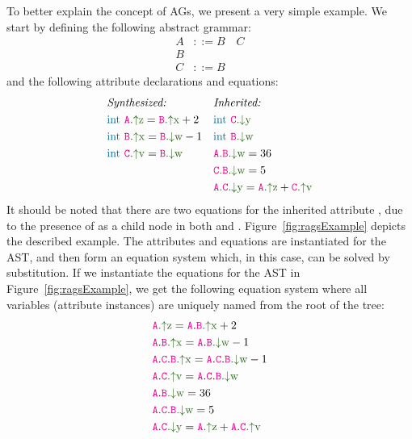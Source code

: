 To better explain the concept of AGs, we present a very simple example.
We start by defining the following abstract grammar:
    \begin{align*}
        A& ::= B \quad C \\
        B& \\
        C& ::= B
    \end{align*}
and the following attribute declarations and equations:
    \begin{align*}
        &\textit{Synthesized:}  && \textit{Inherited:} \\
        &\nativetype{int} \ \Asyn{A}{z} = \Asyn{B}{x} + 2  &&\nativetype{int} \ \Ainh{C}{y} \\
        &\nativetype{int} \ \Asyn{B}{x} = \Ainh{B}{w} -1   &&\nativetype{int} \ \Ainh{B}{w}  \\
       &\nativetype{int} \ \Asyn{C}{v} = \Ainh{B}{w}   & &\Ainhdef{A}{B}{w} = 36\\
        & && \Ainhdef{C}{B}{w} = 5\\
        &&& \Ainhdef{A}{C}{y} = \Asyn{A}{z} + \Asyn{C}{v} \\
    \end{align*}
It should be noted that there are two equations for the inherited attribute ,
due to the presence of  as a child node in both  and .
Figure~\ref{fig:ragsExample} depicts the described example.
The attributes and equations are instantiated for the AST, and then form an equation system which,
in this case, can be solved by substitution.
If we instantiate the equations for the AST in Figure~\ref{fig:ragsExample}, 
we get the following equation system where all variables (attribute instances) 
are uniquely named from the root of the tree:
\begin{align*}
  &\Asyn{A}{z} = \astnode{A}.\Asyn{B}{x} + 2 \\
  &\astnode{A}.\Asyn{B}{x} = \astnode{A}.\Ainh{B}{w} - 1 \\
  &\astnode{A}.\astnode{C}.\Asyn{B}{x} = \astnode{A}.\astnode{C}.\Ainh{B}{w} - 1 \\ 
  &\astnode{A}.\Asyn{C}{v} = \astnode{A}.\astnode{C}.\Ainh{B}{w} \\
  &\astnode{A}.\Ainh{B}{w} = 36 \\
  &\astnode{A}.\astnode{C}.\Ainh{B}{w} = 5 \\
  &\astnode{A}.\Ainh{C}{y} = \Asyn{A}{z} + \astnode{A}.\Asyn{C}{v} \\
\end{align*}
